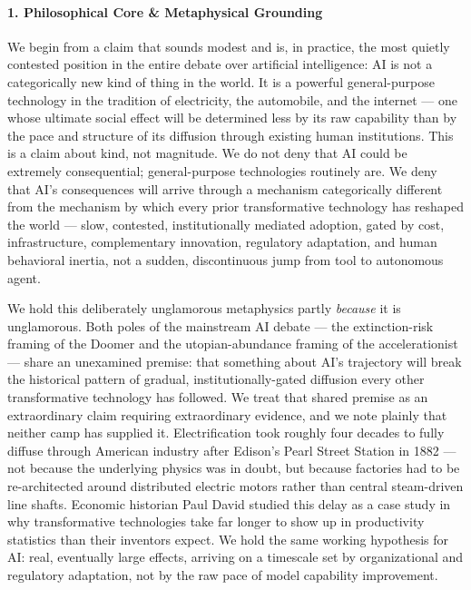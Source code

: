 \paragraph{1. Philosophical Core \& Metaphysical
Grounding}\label{philosophical-core-metaphysical-grounding-20}

We begin from a claim that sounds modest and is, in practice, the most
quietly contested position in the entire debate over artificial
intelligence: AI is not a categorically new kind of thing in the world.
It is a powerful general-purpose technology in the tradition of
electricity, the automobile, and the internet --- one whose ultimate
social effect will be determined less by its raw capability than by the
pace and structure of its diffusion through existing human institutions.
This is a claim about kind, not magnitude. We do not deny that AI could
be extremely consequential; general-purpose technologies routinely are.
We deny that AI's consequences will arrive through a mechanism
categorically different from the mechanism by which every prior
transformative technology has reshaped the world --- slow, contested,
institutionally mediated adoption, gated by cost, infrastructure,
complementary innovation, regulatory adaptation, and human behavioral
inertia, not a sudden, discontinuous jump from tool to autonomous agent.

We hold this deliberately unglamorous metaphysics partly \emph{because}
it is unglamorous. Both poles of the mainstream AI debate --- the
extinction-risk framing of the Doomer and the utopian-abundance framing
of the accelerationist --- share an unexamined premise: that something
about AI's trajectory will break the historical pattern of gradual,
institutionally-gated diffusion every other transformative technology
has followed. We treat that shared premise as an extraordinary claim
requiring extraordinary evidence, and we note plainly that neither camp
has supplied it. Electrification took roughly four decades to fully
diffuse through American industry after Edison's Pearl Street Station in
1882 --- not because the underlying physics was in doubt, but because
factories had to be re-architected around distributed electric motors
rather than central steam-driven line shafts. Economic historian Paul
David studied this delay as a case study in why transformative
technologies take far longer to show up in productivity statistics than
their inventors expect. We hold the same working hypothesis for AI:
real, eventually large effects, arriving on a timescale set by
organizational and regulatory adaptation, not by the raw pace of model
capability improvement.

